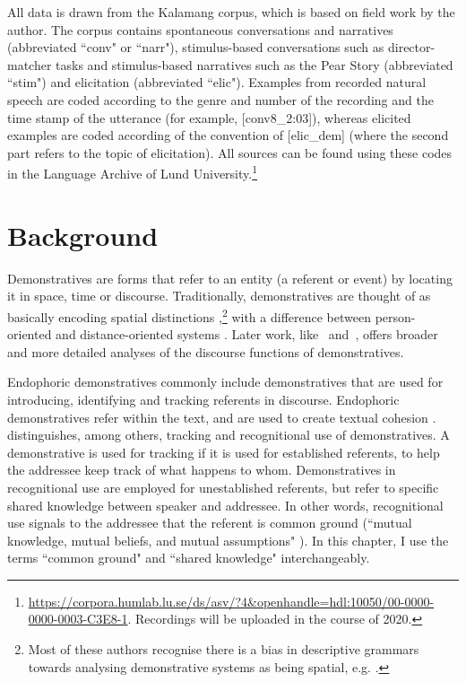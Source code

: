 \documentclass[output=paper,colorlinks,citecolor=brown]{langscibook}
\begin{document}
All data is drawn from the Kalamang corpus, which is based on field work by the author. The corpus contains spontaneous conversations and narratives (abbreviated “conv" or “narr"), stimulus-based conversations such as director-matcher tasks and stimulus-based narratives such as the Pear Story (abbreviated “stim") and elicitation (abbreviated “elic"). Examples from recorded natural speech are coded according to the genre and number of the recording and the time stamp of the utterance (for example, [conv8\_2:03]), whereas elicited examples are coded according of the convention of [elic\_dem] (where the second part refers to the topic of elicitation). All sources can be found using these codes in the Language Archive of Lund University.\footnote{\url{https://corpora.humlab.lu.se/ds/asv/?4&openhandle=hdl:10050/00-0000-0000-0003-C3E8-1}. Recordings will be uploaded in the course of 2020.}


\section{Background}
\label{sec:backg}
Demonstratives are forms that refer to an entity (a referent or event) by locating it in space, time or discourse. Traditionally, demonstratives are thought of as basically encoding spatial distinctions \citep{AndersonKeenan1985,Lyons1977,Diessel1999Book,Dixon2003,Fillmore1997,Kemmerer1999},\footnote{Most of these authors recognise there is a bias in descriptive grammars towards analysing demonstrative systems as being spatial, e.g. \cite{AndersonKeenan1985,Lyons1977,Dixon2003,Diessel1999Book}.} with a difference between person-oriented and distance-oriented systems \citep[e.g.][]{Lyons1977}. Later work, like~\cite{Ozyurek1998} and~\cite{Burenhult2003}, offers broader and more detailed analyses of the discourse functions of demonstratives.

Endophoric demonstratives commonly include demonstratives that are used for introducing, identifying and tracking referents in discourse. Endophoric demonstratives refer within the text, and are used to create textual cohesion \citep[33; 57-76]{HallidayHasan1976}. \cite{Himmelmann1996} distinguishes, among others, tracking and recognitional use of demonstratives. A demonstrative is used for tracking if it is used for established referents, to help the addressee keep track of what happens to whom. Demonstratives in recognitional use are employed for unestablished referents, but refer to specific shared knowledge between speaker and addressee. In other words, recognitional use signals to the addressee that the referent is common ground (“mutual knowledge, mutual beliefs, and mutual assumptions" \citep[127]{ClarkBrennan1991}). In this chapter, I use the terms “common ground" and “shared knowledge" interchangeably.
\end{document}
